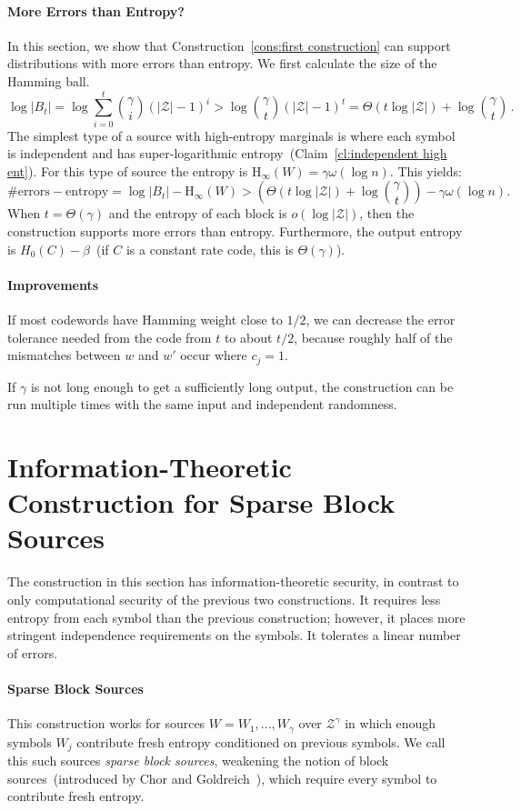 \documentclass[11pt]{article}
\newcommand{\clref}[1]{\mbox{Claim~\ref{#1}}}
\newcommand{\consref}[1]{\mbox{Construction~\ref{#1}}}
\newcommand{\Hoo}{\mathrm{H}_\infty}
\begin{document}
\paragraph{More Errors than Entropy?}
\label{sec:discussion}
In this section, we show that \consref{cons:first construction} can support distributions with more errors than entropy.
We first calculate the size of the Hamming ball.
\[
\log |B_t| = \log \sum_{i=0}^t {\gamma \choose i} (|\mathcal{Z}|-1)^i> \log {\gamma \choose t} (|\mathcal{Z}|-1)^t =\Theta(t\log |\mathcal{Z}|) + \log {\gamma\choose t}\,.
\]
The simplest type of a source with high-entropy marginals is where each symbol is independent and has super-logarithmic entropy~(\clref{cl:independent high ent}).  For this type of source the entropy is $\Hoo(W) = \gamma\omega(\log n)$.  This yields:
\[
\text{\# errors} - \text{entropy} = \log |B_t| -  \Hoo(W)  >\left( \Theta(t\log |\mathcal{Z}|) + \log {\gamma \choose t}\right) -  \gamma \omega(\log n) .
\]
When $t =\Theta(\gamma)$ and the entropy of each block is $o(\log |\mathcal{Z}|)$, then the construction supports more errors than entropy. Furthermore, the output entropy is $H_0(C) -\beta$~(if $C$ is a constant rate code, this is $\Theta(\gamma)$).

\paragraph{Improvements}  If most codewords have Hamming weight close to $1/2$, we can decrease the error tolerance needed from the code from $t$ to  about $t/2$, because roughly half of the mismatches between $w$ and $w'$ occur where $c_j =1$.

If $\gamma$ is not long enough to get a sufficiently long output, the construction can be run multiple times with the same input and independent randomness.


\section{Information-Theoretic Construction for Sparse Block Sources}
\label{sec:info theory cons}
The construction in this section has information-theoretic security, in contrast to only computational security of the previous two constructions. It requires less entropy from each symbol than the previous construction; however, it places more stringent independence requirements on the symbols. It tolerates a linear number of errors.

\paragraph{Sparse Block Sources}
This construction works for sources $W=W_1, ... ,W_\gamma$ over $\mathcal{Z}^\gamma $ in which enough symbols $W_j$ contribute fresh entropy conditioned on previous symbols.  We call this such sources \emph{sparse block sources}, weakening the notion of block sources~(introduced by Chor and Goldreich~\cite{DBLP:journals/siamcomp/ChorG88}), which require every symbol to contribute fresh entropy.
\end{document}
